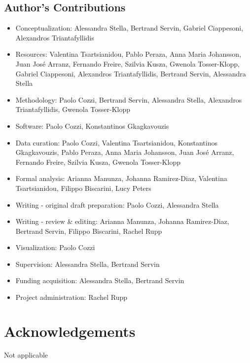 \documentclass[a4paper,num-refs,gigabyte]{oup-contemporary}
\begin{document}
\subsection{Author's Contributions}

\begin{itemize}
\item Conceptualization: Alessandra Stella, Bertrand Servin, Gabriel Ciappesoni, Alexandros Triantafyllidis
\item Resources: Valentina Tsartsianidou, Pablo Peraza, {Anna Maria} Johansson, {Juan José} Arranz, Fernando Freire, Szilvia Kusza, Gwenola Tosser-Klopp, Gabriel Ciappesoni, Alexandros Triantafyllidis, Bertrand Servin, Alessandra Stella
\item Methodology: Paolo Cozzi, Bertrand Servin, Alessandra Stella, Alexandros Triantafyllidis, Gwenola Tosser-Klopp
\item Software: Paolo Cozzi, Konstantinos Gkagkavouzis
\item Data curation: Paolo Cozzi, Valentina Tsartsianidou, Konstantinos Gkagkavouzis, Pablo Peraza, {Anna Maria} Johansson, {Juan José} Arranz, Fernando Freire, Szilvia Kusza, Gwenola Tosser-Klopp
\item Formal analysis: Arianna Manunza, Johanna Ramirez-Diaz, Valentina Tsartsianidou, Filippo Biscarini, Lucy Peters
\item Writing - original draft preparation: Paolo Cozzi, Alessandra Stella
\item Writing - review \& editing: Arianna Manunza, Johanna Ramirez-Diaz, Bertrand Servin, Filippo Biscarini, Rachel Rupp
\item Visualization: Paolo Cozzi
\item Supervision: Alessandra Stella, Bertrand Servin
\item Funding acquisition: Alessandra Stella, Bertrand Servin
\item Project administration: Rachel Rupp
\end{itemize}

\section{Acknowledgements}

Not applicable


\end{document}
